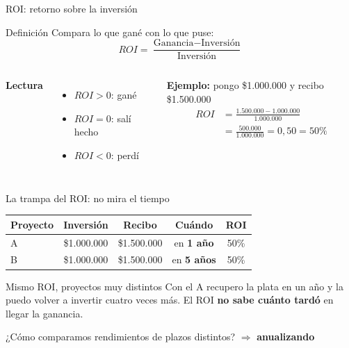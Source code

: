 \documentclass[aspectratio=169,10pt]{beamer}
\begin{document}
\begin{frame}{ROI: retorno sobre la inversión}

\begin{block}{Definición}
Compara lo que gané con lo que puse:
\[
ROI = \frac{\text{Ganancia} - \text{Inversión}}{\text{Inversión}}
\]
\end{block}

\begin{columns}[T]
\textbf{Lectura}
\begin{itemize}
  \item $ROI > 0$: gané
  \item $ROI = 0$: salí hecho
  \item $ROI < 0$: perdí
\end{itemize}

\textbf{Ejemplo:} pongo \$1.000.000 y recibo \$1.500.000
\[
\begin{aligned}
ROI &= \frac{1.500.000 - 1.000.000}{1.000.000} \\[2pt]
    &= \frac{500.000}{1.000.000} = 0{,}50 = 50\%
\end{aligned}
\]
\end{columns}
\end{frame}

\begin{frame}{La trampa del ROI: no mira el tiempo}

\begin{center}
\begin{tabular}{lcccc}
\toprule
\textbf{Proyecto} & \textbf{Inversión} & \textbf{Recibo} & \textbf{Cuándo} & \textbf{ROI} \\
\midrule
A & \$1.000.000 & \$1.500.000 & en \textbf{1 año}  & 50\% \\
B & \$1.000.000 & \$1.500.000 & en \textbf{5 años} & 50\% \\
\bottomrule
\end{tabular}
\end{center}

\vspace{0.4cm}

\begin{alertblock}{Mismo ROI, proyectos muy distintos}
Con el A recupero la plata en un año y la puedo volver a invertir cuatro veces más.
El ROI \textbf{no sabe cuánto tardó} en llegar la ganancia.
\end{alertblock}

\vspace{0.2cm}
\begin{center}
¿Cómo comparamos rendimientos de plazos distintos? $\Rightarrow$ \textbf{anualizando}
\end{center}
\end{frame}
\end{document}
